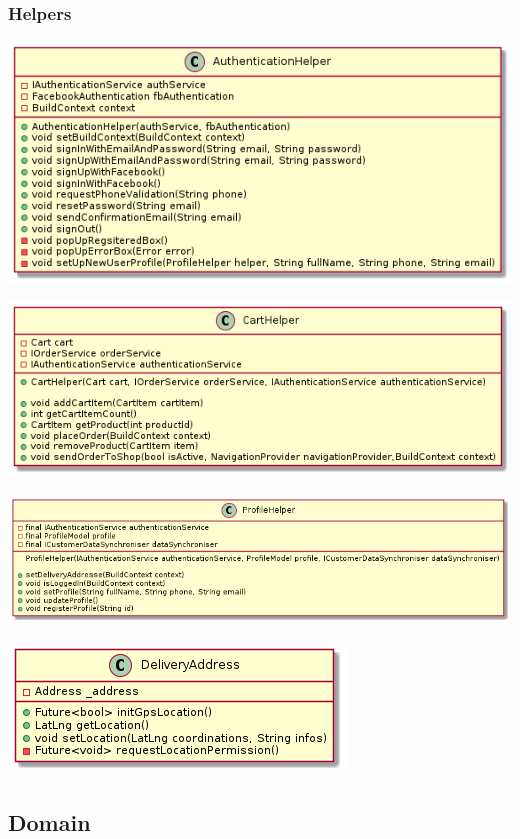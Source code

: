 \documentclass{article}
\begin{document}
\subsubsection{Helpers}

\includegraphics[scale=0.5]{./out/MobileApp/Application/Authentication/AuthHelper.png}

\includegraphics[scale=0.5]{./out/MobileApp/Application/Cart/CartHelper.png}

\includegraphics[scale=0.5]{./out/MobileApp/Application/Profile/ProfileHelper.png}

\includegraphics[scale=1]{./out/MobileApp/Application/Addresse/AddresseHelper.png}


\subsection{Domain}
\end{document}
